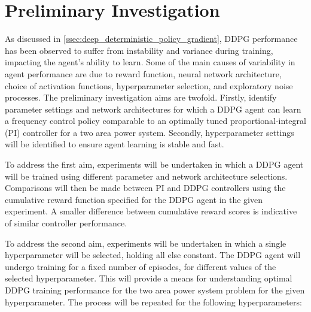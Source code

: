 \section{Preliminary Investigation}\label{sec:preliminary_investigation}
As discussed in \textsection \ref{ssec:deep_deterministic_policy_gradient}, DDPG performance has been observed to suffer from instability and variance during training, impacting the agent's ability to learn. Some of the main causes of variability in agent performance are due to reward function, neural network architecture, choice of activation functions, hyperparameter selection, and exploratory noise processes. The preliminary investigation aims are twofold. Firstly, identify parameter settings and network architectures for which a DDPG agent can learn a frequency control policy comparable to an optimally tuned proportional-integral (PI) controller for a two area power system. Secondly, hyperparameter settings will be identified to ensure agent learning is stable and fast.

To address the first aim, experiments will be undertaken in which a DDPG agent will be trained using different parameter and network architecture selections. Comparisons will then be made between PI and DDPG controllers using the cumulative reward function specified for the DDPG agent in the given experiment. A smaller difference between cumulative reward scores is indicative of similar controller performance.

To address the second aim, experiments will be undertaken in which a single hyperparameter will be selected, holding all else constant. The DDPG agent will undergo training for a fixed number of episodes, for different values of the selected hyperparameter. This will provide a means for understanding optimal DDPG training performance for the two area power system problem for the given hyperparameter. The process will be repeated for the following hyperparameters: 


